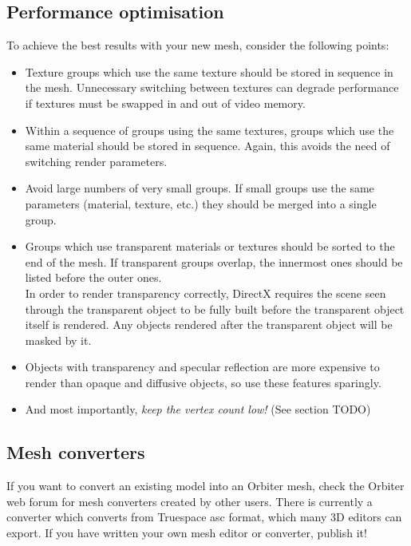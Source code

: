 \documentclass[Orbiter Developer Manual.tex]{subfiles}
\begin{document}
\subsection{Performance optimisation}
To achieve the best results with your new mesh, consider the following points:

\begin{itemize}
\item Texture groups which use the same texture should be stored in sequence in the mesh. Unnecessary switching between textures can degrade performance if textures must be swapped in and out of video memory.
\item Within a sequence of groups using the same textures, groups which use the same material should be stored in sequence. Again, this avoids the need of switching render parameters.
\item Avoid large numbers of very small groups. If small groups use the same parameters (material, texture, etc.) they should be merged into a single group.
\item Groups which use transparent materials or textures should be sorted to the end of the mesh. If transparent groups overlap, the innermost ones should be listed before the outer ones.\\
In order to render transparency correctly, DirectX requires the scene seen through the transparent object to be fully built before the transparent object itself is rendered. Any objects rendered after the transparent object will be masked by it.
\item Objects with transparency and specular reflection are more expensive to render than opaque and diffusive objects, so use these features sparingly.
\item And most importantly, \textit{keep the vertex count low!} (See section TODO)
\end{itemize}


\subsection{Mesh converters}
If you want to convert an existing model into an Orbiter mesh, check the Orbiter web forum for mesh converters created by other users. There is currently a converter which converts from Truespace asc format, which many 3D editors can export. If you have written your own mesh editor or converter, publish it!
\end{document}
